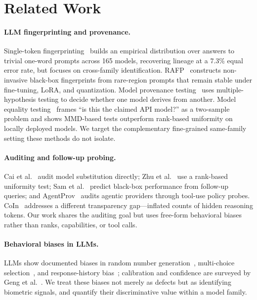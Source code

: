 \documentclass[10pt,twocolumn,letterpaper]{article}
\begin{document}
\section{Related Work}
\label{sec:related}

\paragraph{LLM fingerprinting and provenance.}
Single-token fingerprinting~\cite{bruckner2026token} builds an empirical distribution over answers to trivial one-word prompts across 165 models, recovering lineage at a 7.3\% equal error rate, but focuses on cross-family identification. RAFP~\cite{tsai2025rofl} constructs non-invasive black-box fingerprints from rare-region prompts that remain stable under fine-tuning, LoRA, and quantization. Model provenance testing~\cite{nikolic2025provenance} uses multiple-hypothesis testing to decide whether one model derives from another. Model equality testing~\cite{met2025} frames ``is this the claimed API model?'' as a two-sample problem and shows MMD-based tests outperform rank-based uniformity on locally deployed models. We target the complementary fine-grained same-family setting these methods do not isolate.

\paragraph{Auditing and follow-up probing.}
Cai et al.~\cite{cai2025pay} audit model substitution directly; Zhu et al.~\cite{zhu2025rank} use a rank-based uniformity test; Sam et al.~\cite{sam2025followup} predict black-box performance from follow-up queries; and AgentProv~\cite{wang2026agentprov} audits agentic providers through tool-use policy probes. CoIn~\cite{sun2025coin} addresses a different transparency gap---inflated counts of hidden reasoning tokens. Our work shares the auditing goal but uses free-form behavioral biases rather than ranks, capabilities, or tool calls.

\paragraph{Behavioral biases in LLMs.}
LLMs show documented biases in random number generation~\cite{coronado2025rng}, multi-choice selection~\cite{zheng2023selection}, and response-history bias~\cite{vo2025bscore}; calibration and confidence are surveyed by Geng et al.~\cite{geng2024survey}. We treat these biases not merely as defects but as identifying biometric signals, and quantify their discriminative value within a model family.
\end{document}
